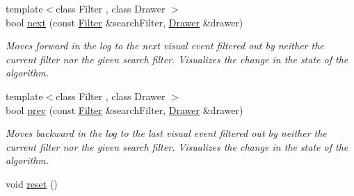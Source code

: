 \begin{DoxyCompactItemize}
{\footnotesize template$<$class Filter , class Drawer $>$ }\\bool \hyperlink{structVisualLog_a9d52f9be390cd2177c25ba9fc0b066f6}{next} (const \hyperlink{structFilter}{Filter} \&search\+Filter, \hyperlink{structDrawer}{Drawer} \&drawer)
\begin{DoxyCompactList}\small\item\em Moves forward in the log to the next visual event filtered out by neither the current filter nor the given search filter. Visualizes the change in the state of the algorithm. \end{DoxyCompactList}\item 
{\footnotesize template$<$class Filter , class Drawer $>$ }\\bool \hyperlink{structVisualLog_a72438672f7c6d5df2fed5922509a1e60}{prev} (const \hyperlink{structFilter}{Filter} \&search\+Filter, \hyperlink{structDrawer}{Drawer} \&drawer)
\begin{DoxyCompactList}\small\item\em Moves backward in the log to the last visual event filtered out by neither the current filter nor the given search filter. Visualizes the change in the state of the algorithm. \end{DoxyCompactList}\item 
void \hyperlink{structVisualLog_a3a8ff07907e7d4b95be1ad70cb750407}{reset} ()\hypertarget{structVisualLog_a3a8ff07907e7d4b95be1ad70cb750407}{}\label{structVisualLog_a3a8ff07907e7d4b95be1ad70cb750407}


\end{DoxyCompactItemize}
